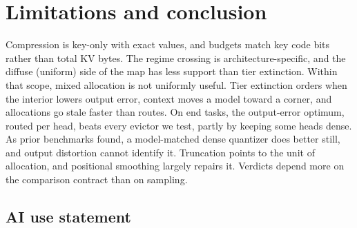 \documentclass{article}
\theoremstyle{definition}
\begin{document}
\section{Limitations and conclusion}
\label{sec:conclusion}

Compression is key-only with exact values, and budgets match key code bits rather than total KV bytes. %
The regime crossing is architecture-specific, and the diffuse (uniform) side of the map has less support than tier extinction.
Within that scope, mixed allocation is not uniformly useful.  Tier extinction orders when the interior lowers output error, context moves a model toward a corner, and allocations go stale faster than routes.
On end tasks, the output-error optimum, routed per head, beats every evictor we test, partly by keeping some heads dense.  As prior benchmarks found, a model-matched dense quantizer does better still, and output distortion cannot identify it.
Truncation points to the unit of allocation, and positional smoothing largely repairs it.  Verdicts depend more on the comparison contract than on sampling.

\label{main:end}

\subsection*{AI use statement}
\end{document}
